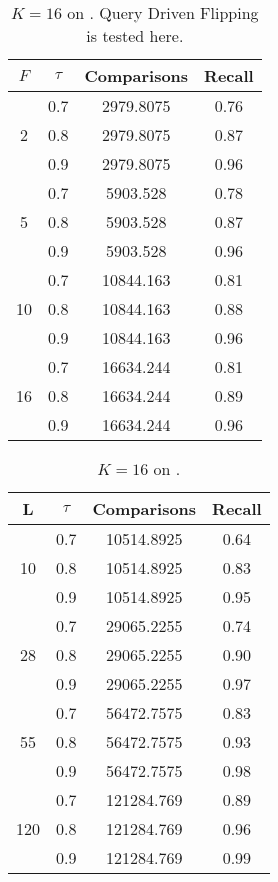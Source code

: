 \documentclass[11pt]{article}
\begin{document}
\begin{table}
\centering
\begin{tabular}{|c|c|c|c|}
\hline
$F$ & $\tau$ & Comparisons & Recall \\ 
\hline
\multirow{3}{*}{2} & 0.7 & 2979.8075 & 0.76 \\
 & 0.8 & 2979.8075 & 0.87 \\
 & 0.9 & 2979.8075 & 0.96 \\
\hline
\multirow{3}{*}{5} & 0.7 & 5903.528 & 0.78 \\
 & 0.8 & 5903.528 & 0.87 \\
 & 0.9 & 5903.528 & 0.96 \\
\hline
\multirow{3}{*}{10} & 0.7 & 10844.163 & 0.81 \\
 & 0.8 & 10844.163 & 0.88 \\
 & 0.9 & 10844.163 & 0.96 \\
\hline
\multirow{3}{*}{16} & 0.7 & 16634.244 & 0.81 \\
 & 0.8 & 16634.244 & 0.89 \\
 & 0.9 & 16634.244 & 0.96 \\
\hline 
 \end{tabular}
\caption{\footnotesize{$K=16$ on \dataA. Query Driven Flipping is tested here.}}
\label{tab:data-so}
\end{table}



\begin{table}
\centering
\begin{tabular}{|c|c|c|c|}
\hline
L & $\tau$ & Comparisons & Recall \\ 
\hline
\multirow{3}{*}{10} & 0.7 & 10514.8925 & 0.64 \\
 & 0.8 & 10514.8925 & 0.83 \\
 & 0.9 & 10514.8925 & 0.95 \\
\hline
\multirow{3}{*}{28} & 0.7 & 29065.2255 & 0.74 \\
 & 0.8 & 29065.2255 & 0.90 \\
 & 0.9 & 29065.2255 & 0.97 \\
\hline
\multirow{3}{*}{55} & 0.7 & 56472.7575 & 0.83 \\
 & 0.8 & 56472.7575 & 0.93 \\
 & 0.9 & 56472.7575 & 0.98 \\
\hline
\multirow{3}{*}{120} & 0.7 & 121284.769 & 0.89 \\
 & 0.8 & 121284.769 & 0.96 \\
 & 0.9 & 121284.769 & 0.99 \\
\hline 
 \end{tabular}
\caption{\footnotesize{$K=16$ on \dataB.}}
\label{tab:data-so}
\end{table}
\end{document}

